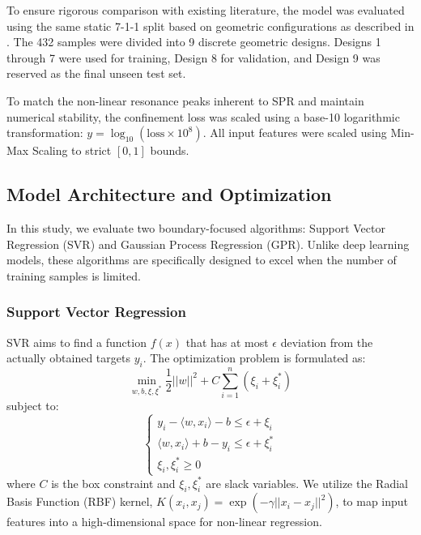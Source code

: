 \documentclass[conference]{IEEEtran}
\begin{document}
To ensure rigorous comparison with existing literature, the model was evaluated using the same static 7-1-1 split based on geometric configurations as described in \cite{b1}. The 432 samples were divided into 9 discrete geometric designs. Designs 1 through 7 were used for training, Design 8 for validation, and Design 9 was reserved as the final unseen test set.

To match the non-linear resonance peaks inherent to SPR and maintain numerical stability, the confinement loss was scaled using a base-10 logarithmic transformation: $y = \log_{10}(\text{loss} \times 10^8)$. All input features were scaled using Min-Max Scaling to strict $[0, 1]$ bounds.

\subsection{Model Architecture and Optimization}
In this study, we evaluate two boundary-focused algorithms: Support Vector Regression (SVR) and Gaussian Process Regression (GPR). Unlike deep learning models, these algorithms are specifically designed to excel when the number of training samples is limited.

\subsubsection{Support Vector Regression}
SVR aims to find a function $f(x)$ that has at most $\epsilon$ deviation from the actually obtained targets $y_i$. The optimization problem is formulated as:
\begin{equation}
\min_{w,b,\xi,\xi^*} \frac{1}{2}||w||^2 + C \sum_{i=1}^{n} (\xi_i + \xi_i^*)
\end{equation}
subject to:
\begin{equation}
\begin{cases}
y_i - \langle w, x_i \rangle - b \leq \epsilon + \xi_i \\
\langle w, x_i \rangle + b - y_i \leq \epsilon + \xi_i^* \\
\xi_i, \xi_i^* \geq 0
\end{cases}
\end{equation}
where $C$ is the box constraint and $\xi_i, \xi_i^*$ are slack variables. We utilize the Radial Basis Function (RBF) kernel, $K(x_i, x_j) = \exp(-\gamma ||x_i - x_j||^2)$, to map input features into a high-dimensional space for non-linear regression.
\end{document}
